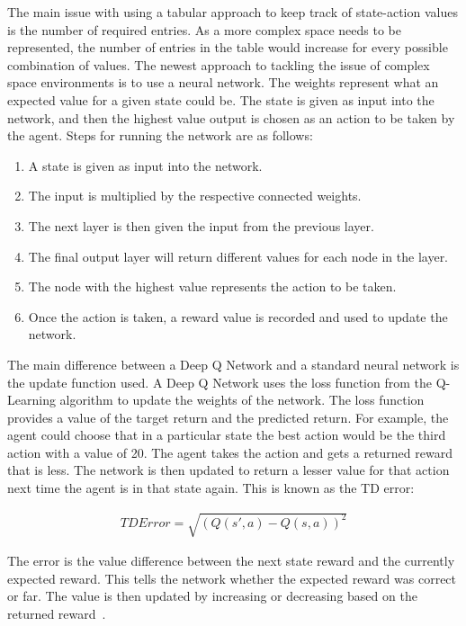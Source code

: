 The main issue with using a tabular approach to keep track of state-action
values is the number of required entries. As a more complex space needs to be
represented, the number of entries in the table would increase for every
possible combination of values. The newest approach to tackling the issue of
complex space environments is to use a neural network. The weights represent
what an expected value for a given state could be. The state is given as input
into the network, and then the highest value output is chosen as an action to be
taken by the agent. Steps for running the network are as follows:

\begin{enumerate}
    \item A state is given as input into the network.
    \item The input is multiplied by the respective connected weights.
    \item The next layer is then given the input from the previous layer.
    \item The final output layer will return different values for each node in
        the layer.
    \item The node with the highest value represents the action to be taken.
    \item Once the action is taken, a reward value is recorded and used to
        update the network.
\end{enumerate}

The main difference between a Deep Q Network and a standard neural network is the
update function used. A Deep Q Network uses the loss function from the
Q-Learning algorithm to update the weights of the network. The loss function
provides a value of the target return and the predicted return. For example, the
agent could choose that in a particular state the best action would be the third
action with a value of 20. The agent takes the action and gets a returned reward
that is less. The network is then updated to return a lesser value for that
action next time the agent is in that state again. This is known as the TD
error:

\begin{align}
    TD Error = \sqrt{{(Q(s',a) - Q(s,a))}^{2}}
\end{align}

The error is the value difference between the next state reward and the
currently expected reward. This tells the network whether the expected reward
was correct or far. The value is then updated by increasing or decreasing based
on the returned reward~\cite{pandey2010reinforcement}.

